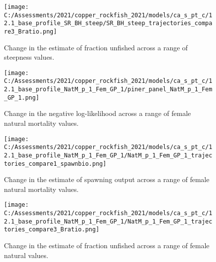 \documentclass[11pt,
  english,
  a4paper,
]{article}
\begin{document}
\tagmcend\tagstructend


\begin{figure}
\centering
\texttt{[image: C:/Assessments/2021/copper\_rockfish\_2021/models/ca\_s\_pt\_c/12.1\_base\_profile\_SR\_BH\_steep/SR\_BH\_steep\_trajectories\_compare3\_Bratio.png]}
\caption{Change in the estimate of fraction unfished across a range of steepness values.\label{fig:h-depl}}
\end{figure}

\tagmcend\tagstructend


\begin{figure}
\centering
\texttt{[image: C:/Assessments/2021/copper\_rockfish\_2021/models/ca\_s\_pt\_c/12.1\_base\_profile\_NatM\_p\_1\_Fem\_GP\_1/piner\_panel\_NatM\_p\_1\_Fem\_GP\_1.png]}
\caption{Change in the negative log-likelihood across a range of female natural mortality values.\label{fig:m-profile}}
\end{figure}

\tagmcend\tagstructend


\begin{figure}
\centering
\texttt{[image: C:/Assessments/2021/copper\_rockfish\_2021/models/ca\_s\_pt\_c/12.1\_base\_profile\_NatM\_p\_1\_Fem\_GP\_1/NatM\_p\_1\_Fem\_GP\_1\_trajectories\_compare1\_spawnbio.png]}
\caption{Change in the estimate of spawning output across a range of female natural mortality values.\label{fig:m-ssb}}
\end{figure}

\tagmcend\tagstructend


\begin{figure}
\centering
\texttt{[image: C:/Assessments/2021/copper\_rockfish\_2021/models/ca\_s\_pt\_c/12.1\_base\_profile\_NatM\_p\_1\_Fem\_GP\_1/NatM\_p\_1\_Fem\_GP\_1\_trajectories\_compare3\_Bratio.png]}
\caption{Change in the estimate of fraction unfished across a range of female natural values.\label{fig:m-depl}}
\end{figure}
\end{document}

